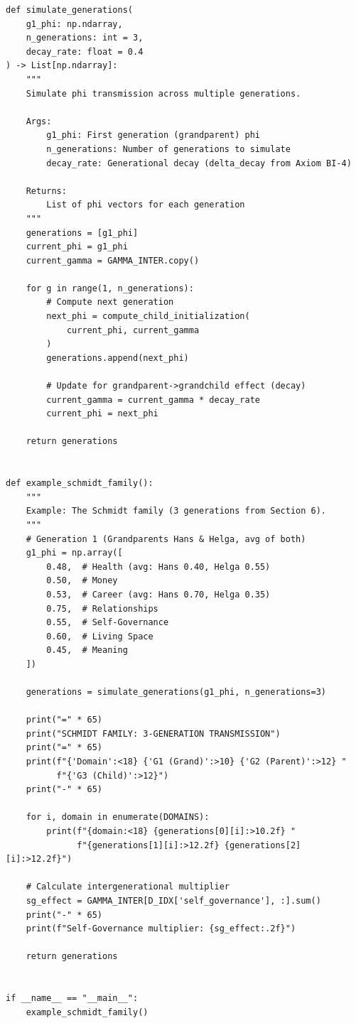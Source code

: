 \begin{verbatim}
def simulate_generations(
    g1_phi: np.ndarray,
    n_generations: int = 3,
    decay_rate: float = 0.4
) -> List[np.ndarray]:
    """
    Simulate phi transmission across multiple generations.

    Args:
        g1_phi: First generation (grandparent) phi
        n_generations: Number of generations to simulate
        decay_rate: Generational decay (delta_decay from Axiom BI-4)

    Returns:
        List of phi vectors for each generation
    """
    generations = [g1_phi]
    current_phi = g1_phi
    current_gamma = GAMMA_INTER.copy()

    for g in range(1, n_generations):
        # Compute next generation
        next_phi = compute_child_initialization(
            current_phi, current_gamma
        )
        generations.append(next_phi)

        # Update for grandparent->grandchild effect (decay)
        current_gamma = current_gamma * decay_rate
        current_phi = next_phi

    return generations


def example_schmidt_family():
    """
    Example: The Schmidt family (3 generations from Section 6).
    """
    # Generation 1 (Grandparents Hans & Helga, avg of both)
    g1_phi = np.array([
        0.48,  # Health (avg: Hans 0.40, Helga 0.55)
        0.50,  # Money
        0.53,  # Career (avg: Hans 0.70, Helga 0.35)
        0.75,  # Relationships
        0.55,  # Self-Governance
        0.60,  # Living Space
        0.45,  # Meaning
    ])

    generations = simulate_generations(g1_phi, n_generations=3)

    print("=" * 65)
    print("SCHMIDT FAMILY: 3-GENERATION TRANSMISSION")
    print("=" * 65)
    print(f"{'Domain':<18} {'G1 (Grand)':>10} {'G2 (Parent)':>12} "
          f"{'G3 (Child)':>12}")
    print("-" * 65)

    for i, domain in enumerate(DOMAINS):
        print(f"{domain:<18} {generations[0][i]:>10.2f} "
              f"{generations[1][i]:>12.2f} {generations[2][i]:>12.2f}")

    # Calculate intergenerational multiplier
    sg_effect = GAMMA_INTER[D_IDX['self_governance'], :].sum()
    print("-" * 65)
    print(f"Self-Governance multiplier: {sg_effect:.2f}")

    return generations


if __name__ == "__main__":
    example_schmidt_family()
\end{verbatim}


